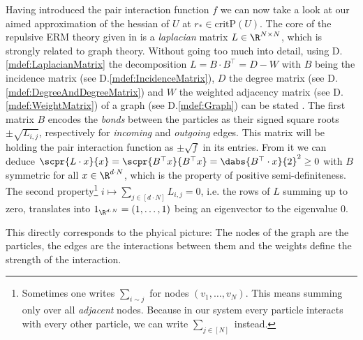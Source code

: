 Having introduced the pair interaction function $f$ we can now take a look at our aimed approximation of the hessian of $U$ at $r_*\in\text{critP}(U)$. The core of the repulsive ERM theory given in \cite{paper:Grigera_2011,mth:vogel} is a \emph{laplacian} matrix $L\in\R^{N\times N}$, which is strongly related to graph theory. Without going too much into detail, using D.\ref{mdef:LaplacianMatrix} the decomposition $L = B\cdot B^\top = D - W$ with $B$ being the incidence matrix (see D.\ref{mdef:IncidenceMatrix}), $D$ the degree matrix (see D.\ref{mdef:DegreeAndDegreeMatrix}) and $W$ the weighted adjacency matrix (see D.\ref{mdef:WeightMatrix}) of a graph (see D.\ref{mdef:Graph}) can be stated \cite{bookchapter:GraphsAndLaplacians}. The first matrix $B$ encodes the \emph{bonds} between the particles as their signed square roots $\pm\sqrt{L_{i,j}}$, respectively for \emph{incoming} and \emph{outgoing} edges. This matrix will be holding the pair interaction function as $\pm\sqrt{f}$ in its entries. 
From it we can deduce $\scpr{L\cdot x}{x} = \scpr{B^\top x}{B^\top x} = \dabs{B^\top\cdot x}{2}^2 \geq 0$ with $B$ symmetric for all $x\in\R^{d\cdot N}$, which is the property of positive semi-definiteness. The second property\footnote{Sometimes one writes $\sum_{i\sim j}$ for nodes $(v_1,\ldots,v_N)$. This means summing only over all \emph{adjacent} nodes. Because in our system every particle interacts with every other particle, we can write $\sum_{j\in[N]}$ instead.} $i\mapsto \sum_{j\in[d\cdot N]}L_{i,j} = 0$, i.e. the rows of $L$ summing up to zero, translates into $1_{\R^{d\cdot N}} = (1,\ldots,1)$ being an eigenvector to the eigenvalue $0$. %

This directly corresponds to the phyical picture: The nodes of the graph are the particles, the edges are the interactions between them and the weights define the strength of the interaction. 

